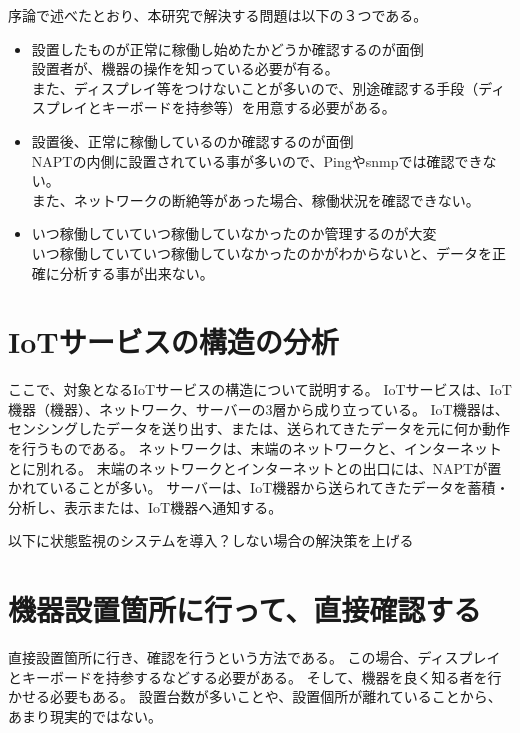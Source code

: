 
序論で述べたとおり、本研究で解決する問題は以下の３つである。
\begin{itemize}
	\item 設置したものが正常に稼働し始めたかどうか確認するのが面倒\\
	設置者が、機器の操作を知っている必要が有る。\\
	また、ディスプレイ等をつけないことが多いので、別途確認する手段（ディスプレイとキーボードを持参等）を用意する必要がある。
	\item 設置後、正常に稼働しているのか確認するのが面倒\\
	NAPTの内側に設置されている事が多いので、Pingやsnmpでは確認できない。\\
	また、ネットワークの断絶等があった場合、稼働状況を確認できない。
	\item いつ稼働していていつ稼働していなかったのか管理するのが大変\\
	いつ稼働していていつ稼働していなかったのかがわからないと、データを正確に分析する事が出来ない。
\end{itemize}


\section{IoTサービスの構造の分析}
ここで、対象となるIoTサービスの構造について説明する。
IoTサービスは、IoT機器（機器）、ネットワーク、サーバーの3層から成り立っている。
IoT機器は、センシングしたデータを送り出す、または、送られてきたデータを元に何か動作を行うものである。
ネットワークは、末端のネットワークと、インターネットとに別れる。
末端のネットワークとインターネットとの出口には、NAPTが置かれていることが多い。
サーバーは、IoT機器から送られてきたデータを蓄積・分析し、表示または、IoT機器へ通知する。
 

%
%


以下に状態監視のシステムを導入？しない場合の解決策を上げる

\section{機器設置箇所に行って、直接確認する}
直接設置箇所に行き、確認を行うという方法である。
この場合、ディスプレイとキーボードを持参するなどする必要がある。
そして、機器を良く知る者を行かせる必要もある。
設置台数が多いことや、設置個所が離れていることから、あまり現実的ではない。

